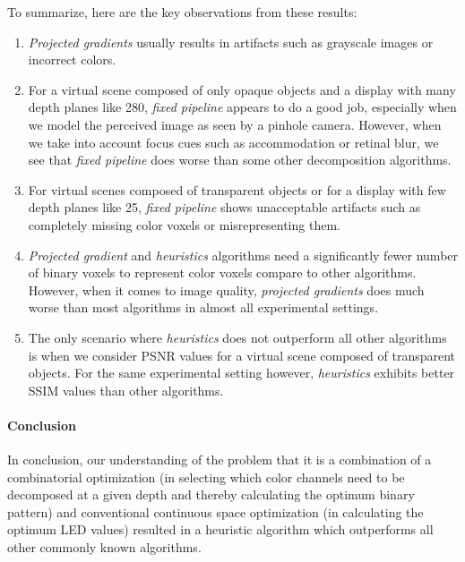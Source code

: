 To summarize, here are the key observations from these results:
\begin{enumerate}
    \item \emph{Projected gradients} usually results in artifacts such as grayscale images or incorrect colors. 
    \item For a virtual scene composed of only opaque objects and a display with many depth planes like 280, \emph{fixed pipeline} appears to do a good job, especially when we model the perceived image as seen by a pinhole camera. However, when we take into account focus cues such as accommodation or retinal blur, we see that \emph{fixed pipeline} does worse than some other decomposition algorithms. 
    \item For virtual scenes composed of transparent objects or for a display with few depth planes like 25, \emph{fixed pipeline} shows unacceptable artifacts such as completely missing color voxels or misrepresenting them. 
    \item \emph{Projected gradient} and \emph{heuristics} algorithms need a significantly fewer number of binary voxels to represent color voxels compare to other algorithms. However, when it comes to image quality, \emph{projected gradients} does much worse than most algorithms in almost all experimental settings.
    \item The only scenario where \emph{heuristics} does not outperform all other algorithms is when we consider PSNR values for a virtual scene composed of transparent objects. For the same experimental setting however, \emph{heuristics} exhibits better SSIM values than other algorithms.
\end{enumerate}

\paragraph{Conclusion}
In conclusion, our understanding of the problem that it is a combination of a combinatorial optimization (in selecting which color channels need to be decomposed at a given depth and thereby calculating the optimum binary pattern) and conventional continuous space optimization (in calculating the optimum LED values) resulted in a heuristic algorithm which outperforms all other commonly known algorithms.

